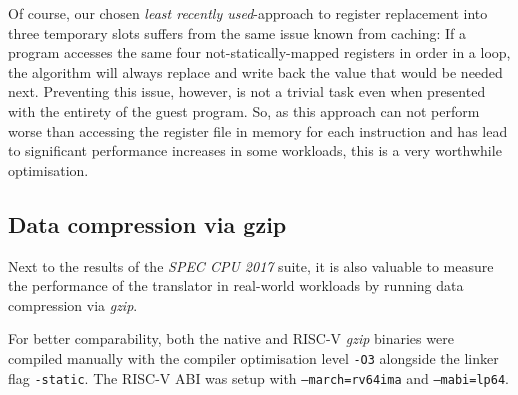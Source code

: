Of course, our chosen \textit{least recently used}-approach to register replacement into three temporary slots suffers from the same issue known from caching:
If a program accesses the same four not-statically-mapped registers in order in a loop, the algorithm will always replace and write back the value that would be needed next.
Preventing this issue, however, is not a trivial task even when presented with the entirety of the guest program.
So, as this approach can not perform worse than accessing the register file in memory for each instruction and has lead to significant performance increases in some workloads, this is a very worthwhile optimisation.



\subsection{Data compression via gzip}
Next to the results of the \textit{SPEC CPU 2017} suite, it is also valuable to measure the performance of the translator in real-world workloads by running data compression via \textit{gzip}.

For better comparability, both the native and RISC-V \textit{gzip} binaries were compiled manually with the compiler optimisation level \texttt{-O3} alongside the linker flag \texttt{-static}.
The RISC-V ABI was setup with \texttt{--march=rv64ima} and \texttt{--mabi=lp64}.

